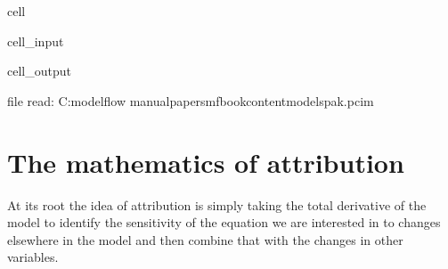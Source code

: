 \documentclass[letterpaper,10pt,english]{jupyterBook}
\begin{document}
\begin{sphinxuseclass}{cell}\begin{sphinxVerbatimInput}

\begin{sphinxuseclass}{cell_input}
\begin{sphinxVerbatim}[commandchars=\\\{\}]
  
    
   
\end{sphinxVerbatim}

\end{sphinxuseclass}\end{sphinxVerbatimInput}
\begin{sphinxVerbatimOutput}

\begin{sphinxuseclass}{cell_output}
\begin{sphinxVerbatim}[commandchars=\\\{\}]
file read:  C:\PYGZbs{}modelflow manual\PYGZbs{}papers\PYGZbs{}mfbook\PYGZbs{}content\PYGZbs{}models\PYGZbs{}pak.pcim
\end{sphinxVerbatim}

\end{sphinxuseclass}\end{sphinxVerbatimOutput}

\end{sphinxuseclass}

\section{The mathematics of attribution}
\label{\detokenize{content/06_ModelAnalytics/AttributionSomeFeatures:the-mathematics-of-attribution}}
\sphinxAtStartPar
At its root the idea of attribution is simply taking the total derivative of the model to identify the sensitivity of the equation we are interested in to changes elsewhere in the model and then combine that with the changes in other variables.
\end{document}
